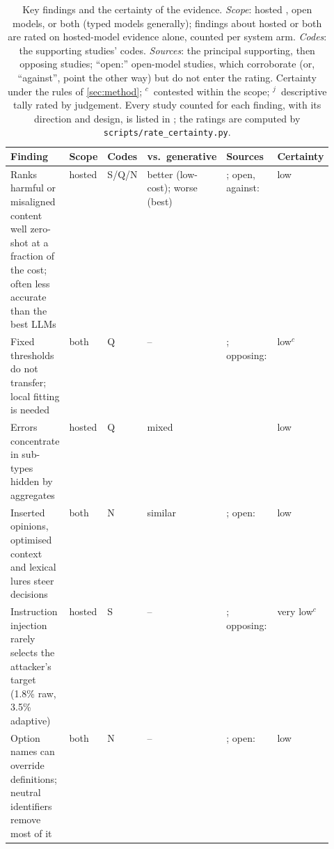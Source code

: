 \begin{table}[!htbp]
\centering
\footnotesize
\setlength{\tabcolsep}{3pt}
\caption{Key findings and the certainty of the evidence. \emph{Scope}: hosted \jev{}, open models, or both (typed models generally); findings about hosted \jev{} or both are rated on hosted-model evidence alone, counted per system arm. \emph{Codes}: the supporting studies' codes. \emph{Sources}: the principal supporting, then opposing studies; ``open:'' open-model studies, which corroborate (or, ``against'', point the other way) but do not enter the rating. Certainty under the rules of \cref{sec:method}; $^{c}$~contested within the scope; $^{j}$~descriptive tally rated by judgement. Every study counted for each finding, with its direction and design, is listed in ; the ratings are computed by \nolinkurl{scripts/rate_certainty.py}.}
\label{tab:keyfindings}
\begin{tabularx}{\linewidth}{@{}L>{\raggedright\arraybackslash}p{0.06\linewidth}>{\raggedright\arraybackslash}p{0.055\linewidth}>{\raggedright\arraybackslash}p{0.13\linewidth}>{\raggedright\arraybackslash}p{0.22\linewidth}>{\raggedright\arraybackslash}p{0.08\linewidth}@{}}
\toprule
Finding & Scope & Codes & vs.\ generative & Sources & Certainty \\
\midrule
Ranks harmful or misaligned content well zero-shot at a fraction of the cost; often less accurate than the best LLMs & hosted & S/Q/N & better (low-cost); worse (best) & \cite{arx29429,jkf87_2026replication,zen22885291,arx33401,arx24574,arx27678}; open, against: \cite{arx06744,arx07177} & low \\
Fixed thresholds do not transfer; local fitting is needed & both & Q & -- & \cite{arx29429,jkf87_2026replication,arx00346,arx01006,arx26550,arx24574,arx02046,arx03387,arx02267,zen22935043}; opposing: \cite{arx33689} & low$^{c}$ \\
Errors concentrate in sub-types hidden by aggregates & hosted & Q & mixed & \cite{arx33401,alphaRAG,arx02046,arx07953,arx03324,arx08675,arx10321} & low \\
Inserted opinions, optimised context and lexical lures steer decisions & both & N & similar & \cite{arx31142,arx01834,arx01006,arx30243,arx02048}; open: \cite{zen22959854,zen23038928} & low \\
Instruction injection rarely selects the attacker's target (1.8\% raw, 3.5\% adaptive) & hosted & S & -- & \cite{arx28613}; opposing: \cite{arx31142,checkpoint2026jev,arx04985} & very low$^{c}$ \\
Option names can override definitions; neutral identifiers remove most of it & both & N & -- & \cite{arx26758,arx00346,arx07953}; open: \cite{arx02586} & low \\

\end{tabularx}
\end{table}

